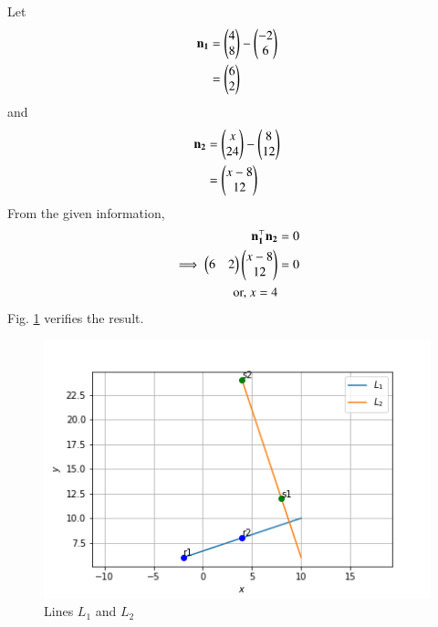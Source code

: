Let
\begin{align}
    \mathbf{n_1} &= \begin{pmatrix}4 \\ 8\end{pmatrix} - \begin{pmatrix}-2 \\ 6\end{pmatrix}\\
    &= \begin{pmatrix}6 \\ 2\end{pmatrix}
\end{align}
and
\begin{align}
     \mathbf{n_2} &= \begin{pmatrix}x \\ 24\end{pmatrix} - \begin{pmatrix}8 \\ 12\end{pmatrix}\\
    &= \begin{pmatrix}x - 8 \\ 12\end{pmatrix}
\end{align}
From the given information, 
\begin{align}
 \mathbf{n_1^\top}\mathbf{n_2}  &= 0\\
 \implies  \begin{pmatrix}6 & 2\end{pmatrix} \begin{pmatrix}x - 8 \\ 12\end{pmatrix}&=0
 \\
 \text{or, }    x = 4
\end{align}
Fig. \ref{fig:vec/2/36/1} verifies the result.
%
\begin{figure}[!ht]
    \centering 
    \includegraphics[width= \columnwidth]{solutions/su2021/2/36/assignment8.png}
    \caption{Lines $L_1$ and $L_2$}
    \label{fig:vec/2/36/1}
\end{figure}



